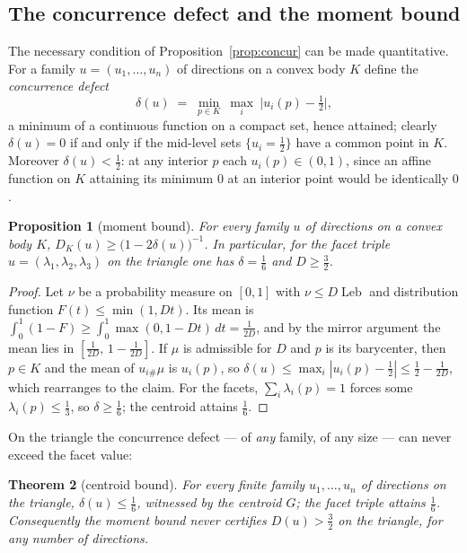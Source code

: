 \documentclass[11pt,reqno]{amsart}
\theoremstyle{plain}
\newtheorem{theorem}{Theorem}[section]
\newtheorem{proposition}[theorem]{Proposition}
\theoremstyle{definition}
\theoremstyle{remark}
\newcommand{\Leb}{\operatorname{Leb}}
\begin{document}
\subsection*{The concurrence defect and the moment bound}
The necessary condition of Proposition~\ref{prop:concur} can be made
quantitative. For a family $u=(u_1,\dots,u_n)$ of directions on a convex body
$K$ define the \emph{concurrence defect}
\begin{equation}\label{eq:cdefect}
\delta(u)\;=\;\min_{p\in K}\ \max_{i}\ \bigl|u_i(p)-\tfrac12\bigr|,
\end{equation}
a minimum of a continuous function on a compact set, hence attained; clearly
$\delta(u)=0$ if and only if the mid-level sets $\{u_i=\tfrac12\}$ have a
common point in $K$. Moreover $\delta(u)<\tfrac12$:
at any interior $p$ each $u_i(p)\in(0,1)$, since an affine function on $K$
attaining its minimum $0$ at an interior point would be identically $0$.

\begin{proposition}[moment bound]\label{prop:moment}
For every family $u$ of directions on a convex body $K$,
$D_K(u)\ge\bigl(1-2\delta(u)\bigr)^{-1}$. In particular, for the facet triple
$u=(\lambda_1,\lambda_2,\lambda_3)$ on the triangle one has $\delta=\tfrac16$
and $D\ge\tfrac32$.
\end{proposition}

\begin{proof}
Let $\nu$ be a probability measure on $[0,1]$ with $\nu\le D\Leb$ and
distribution function $F(t)\le\min(1,Dt)$. Its mean is
$\int_0^1(1-F)\ge\int_0^1\max(0,1-Dt)\,dt=\tfrac1{2D}$, and by the mirror
argument the mean lies in $[\tfrac1{2D},\,1-\tfrac1{2D}]$. If $\mu$ is
admissible for $D$ and $p$ is its barycenter, then $p\in K$ and the mean of
$u_{i\#}\mu$ is $u_i(p)$, so
$\delta(u)\le\max_i|u_i(p)-\tfrac12|\le\tfrac12-\tfrac1{2D}$, which rearranges
to the claim. For the facets, $\sum_i\lambda_i(p)=1$ forces some
$\lambda_i(p)\le\tfrac13$, so $\delta\ge\tfrac16$; the centroid attains
$\tfrac16$.
\end{proof}

On the triangle the concurrence defect --- of \emph{any} family, of any size
--- can never exceed the facet value:

\begin{theorem}[centroid bound]\label{thm:centroid}
For every finite family $u_1,\dots,u_n$ of directions on the triangle,
$\delta(u)\le\tfrac16$, witnessed by the centroid $G$; the facet triple attains
$\tfrac16$. Consequently the moment bound never certifies
$D(u)>\tfrac32$ on the triangle, for any number of directions.
\end{theorem}
\end{document}
